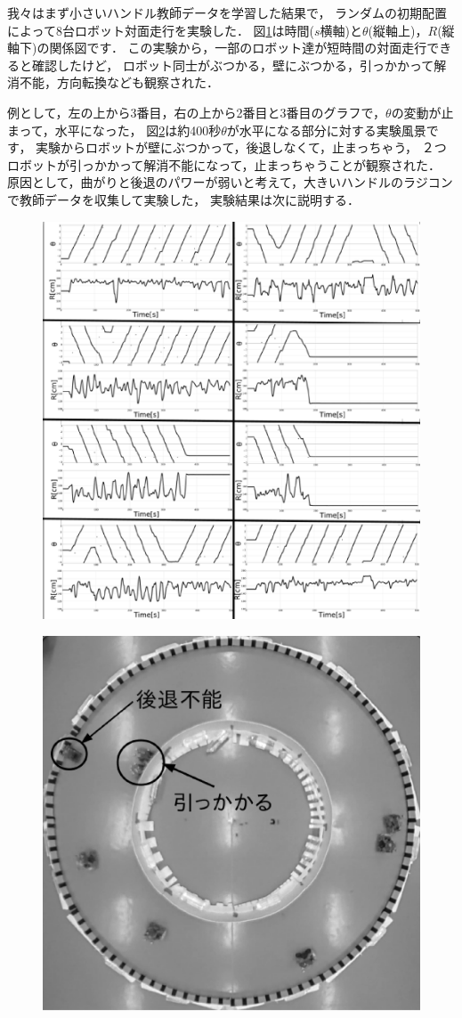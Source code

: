 我々はまず小さいハンドル教師データを学習した結果で，
ランダムの初期配置によって8台ロボット対面走行を実験した．
図\ref{handle15_dia}は時間($s$横軸)と$\theta$(縦軸上)，$R$(縦軸下)の関係図です．
この実験から，一部のロボット達が短時間の対面走行できると確認したけど，
ロボット同士がぶつかる，壁にぶつかる，引っかかって解消不能，方向転換なども観察された．

例として，左の上から3番目，右の上から2番目と3番目のグラフで，$\theta$の変動が止まって，水平になった，
図\ref{handle15_img}は約400秒$\theta$が水平になる部分に対する実験風景です，
実験からロボットが壁にぶつかって，後退しなくて，止まっちゃう，
２つロボットが引っかかって解消不能になって，止まっちゃうことが観察された．
原因として，曲がりと後退のパワーが弱いと考えて，大きいハンドルのラジコンで教師データを収集して実験した，
実験結果は次に説明する．

\vspace{-1mm}
\begin{figure}[!ht]
    \centering
    \includegraphics[width=1.0\linewidth]{NN_handle15.eps}
    \caption{}
    \label{handle15_dia}
\end{figure}

\vspace{-5mm}
\begin{figure}[!ht]
    \centering
    \includegraphics[width=0.6\linewidth]{nnhandle15.eps}
    \caption{}
    \label{handle15_img}
\end{figure}
